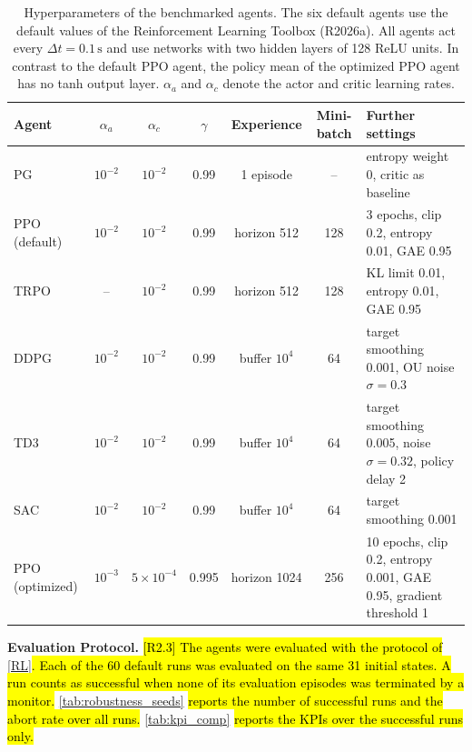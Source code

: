\documentclass{ieeeaccess}
\newcommand{\hlone}[1]{{\sethlcolor{rone}\hl{#1}}}
\begin{document}
\begin{table}[!t]
\centering
\caption{Hyperparameters of the benchmarked agents. The six default agents use the default
values of the Reinforcement Learning Toolbox (R2026a). All agents act every $\Delta t = 0.1\,\mathrm{s}$
and use networks with two hidden layers of 128 ReLU units. In contrast to the default PPO
agent, the policy mean of the optimized PPO agent has no tanh output layer. $\alpha_a$ and
$\alpha_c$ denote the actor and critic learning rates.}
\label{tab:hyperparameters}
\begin{tabular}{lcccccl}
\toprule
\textbf{Agent} & $\alpha_a$ & $\alpha_c$ & $\gamma$ & \textbf{Experience} & \textbf{Mini-batch} & \textbf{Further settings} \\
\midrule
PG & $10^{-2}$ & $10^{-2}$ & 0.99 & 1 episode & -- & entropy weight 0, critic as baseline \\
PPO (default) & $10^{-2}$ & $10^{-2}$ & 0.99 & horizon 512 & 128 & 3 epochs, clip 0.2, entropy 0.01, GAE 0.95 \\
TRPO & -- & $10^{-2}$ & 0.99 & horizon 512 & 128 & KL limit 0.01, entropy 0.01, GAE 0.95 \\
DDPG & $10^{-2}$ & $10^{-2}$ & 0.99 & buffer $10^4$ & 64 & target smoothing 0.001, OU noise $\sigma = 0.3$ \\
TD3 & $10^{-2}$ & $10^{-2}$ & 0.99 & buffer $10^4$ & 64 & target smoothing 0.005, noise $\sigma = 0.32$, policy delay 2 \\
SAC & $10^{-2}$ & $10^{-2}$ & 0.99 & buffer $10^4$ & 64 & target smoothing 0.001 \\
\midrule
PPO (optimized) & $10^{-3}$ & $5\!\times\!10^{-4}$ & 0.995 & horizon 1024 & 256 & 10 epochs, clip 0.2, entropy 0.001, GAE 0.95, gradient threshold 1 \\
\bottomrule
\end{tabular}
\end{table}


\textbf{Evaluation Protocol.} \hlone{[R2.3] The agents were evaluated with the protocol of} \cref{RL}\hlone{. Each of the 60
default runs was evaluated on the same 31 initial states. A run counts as successful when none of its
evaluation episodes was terminated by a monitor.} \cref{tab:robustness_seeds} \hlone{reports the number of
successful runs and the abort rate over all runs.} \cref{tab:kpi_comp} \hlone{reports the KPIs over the
successful runs only.}
\end{document}
